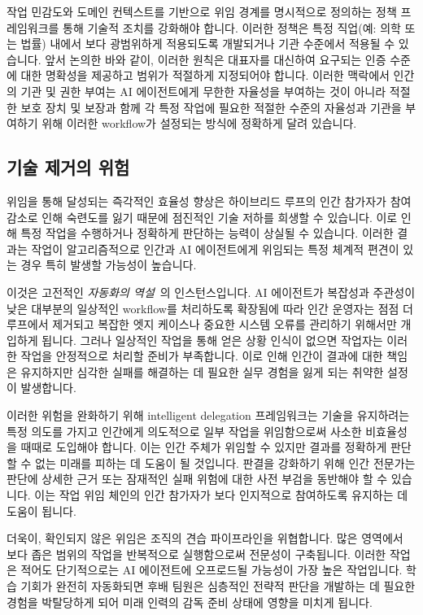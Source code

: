\documentclass[11pt, a4paper, twocolumn, copyright, goog]{google}
\begin{document}
작업 민감도와 도메인 컨텍스트를 기반으로 위임 경계를 명시적으로 정의하는 정책 프레임워크를 통해 기술적 조치를 강화해야 합니다. 이러한 정책은 특정 직업(예: 의학 또는 법률) 내에서 보다 광범위하게 적용되도록 개발되거나 기관 수준에서 적용될 수 있습니다. 앞서 논의한 바와 같이, 이러한 원칙은 대표자를 대신하여 요구되는 인증 수준에 대한 명확성을 제공하고 범위가 적절하게 지정되어야 합니다. 이러한 맥락에서 인간의 기관 및 권한 부여는 AI 에이전트에게 무한한 자율성을 부여하는 것이 아니라 적절한 보호 장치 및 보장과 함께 각 특정 작업에 필요한 적절한 수준의 자율성과 기관을 부여하기 위해 이러한 workflow가 설정되는 방식에 정확하게 달려 있습니다.

\subsection{기술 제거의 위험}
\label{sec:deskill}

위임을 통해 달성되는 즉각적인 효율성 향상은 하이브리드 루프의 인간 참가자가 참여 감소로 인해 숙련도를 잃기 때문에 점진적인 기술 저하를 희생할 수 있습니다. 이로 인해 특정 작업을 수행하거나 정확하게 판단하는 능력이 상실될 수 있습니다. 이러한 결과는 작업이 알고리즘적으로 인간과 AI 에이전트에게 위임되는 특정 체계적 편견이 있는 경우 특히 발생할 가능성이 높습니다.

이것은 고전적인 \emph{자동화의 역설}~\citep{BAINBRIDGE1983775}의 인스턴스입니다. AI 에이전트가 복잡성과 주관성이 낮은 대부분의 일상적인 workflow를 처리하도록 확장됨에 따라 인간 운영자는 점점 더 루프에서 제거되고 복잡한 엣지 케이스나 중요한 시스템 오류를 관리하기 위해서만 개입하게 됩니다. 그러나 일상적인 작업을 통해 얻은 상황 인식이 없으면 작업자는 이러한 작업을 안정적으로 처리할 준비가 부족합니다. 이로 인해 인간이 결과에 대한 책임은 유지하지만 심각한 실패를 해결하는 데 필요한 실무 경험을 잃게 되는 취약한 설정이 발생합니다.

이러한 위험을 완화하기 위해 intelligent delegation 프레임워크는 기술을 유지하려는 특정 의도를 가지고 인간에게 의도적으로 일부 작업을 위임함으로써 사소한 비효율성을 때때로 도입해야 합니다. 이는 인간 주체가 위임할 수 있지만 결과를 정확하게 판단할 수 없는 미래를 피하는 데 도움이 될 것입니다. 판결을 강화하기 위해 인간 전문가는 판단에 상세한 근거 또는 잠재적인 실패 위험에 대한 사전 부검을 동반해야 할 수 있습니다. 이는 작업 위임 체인의 인간 참가자가 보다 인지적으로 참여하도록 유지하는 데 도움이 됩니다.

더욱이, 확인되지 않은 위임은 조직의 견습 파이프라인을 위협합니다. 많은 영역에서 보다 좁은 범위의 작업을 반복적으로 실행함으로써 전문성이 구축됩니다. 이러한 작업은 적어도 단기적으로는 AI 에이전트에 오프로드될 가능성이 가장 높은 작업입니다. 학습 기회가 완전히 자동화되면 후배 팀원은 심층적인 전략적 판단을 개발하는 데 필요한 경험을 박탈당하게 되어 미래 인력의 감독 준비 상태에 영향을 미치게 됩니다.
\end{document}
